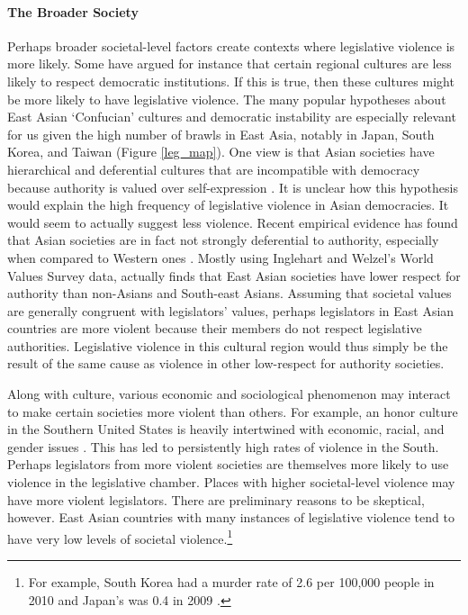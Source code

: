 \documentclass[a4paper]{article}\usepackage[]{graphicx}\usepackage[]{color}
\begin{document}
\paragraph{The Broader Society}

Perhaps broader societal-level factors create contexts where legislative violence is more likely. Some have argued for instance that certain regional cultures are less likely to respect democratic institutions. If this is true, then these cultures might be more likely to have legislative violence. The many popular hypotheses about East Asian `Confucian' cultures \citep[see][]{Inglehart2005, Inglehart2010} and democratic instability are especially relevant for us given the high number of brawls in East Asia, notably in Japan, South Korea, and Taiwan (Figure \ref{leg_map}). One view is that Asian societies have hierarchical and deferential cultures that are incompatible with democracy because authority is valued over self-expression \citep[see][212-213 for a discussion]{Dalton2005}. It is unclear how this hypothesis would explain the high frequency of legislative violence in Asian democracies. It would seem to actually suggest less violence. Recent empirical evidence has found that Asian societies are in fact not strongly deferential to authority, especially when compared to Western ones \citep{Dalton2005, KimAsianValues2010}. Mostly using Inglehart and Welzel's World Values Survey data, \cite{KimAsianValues2010} actually finds that East Asian societies have lower respect for authority than non-Asians and South-east Asians. Assuming that societal values are generally congruent with legislators' values, perhaps legislators in East Asian countries are more violent because their members do not respect legislative authorities. Legislative violence in this cultural region would thus simply be the result of the same cause as violence in other low-respect for authority societies.

Along with culture, various economic and sociological phenomenon may interact to make certain societies more violent than others. For example, an honor culture in the Southern United States is heavily intertwined with economic, racial, and gender issues \citep[see][]{nisbett1996culture}. This has led to persistently high rates of violence in the South. Perhaps legislators from more violent societies are themselves more likely to use violence in the legislative chamber. Places with higher societal-level violence may have more violent legislators. There are preliminary reasons to be skeptical, however. East Asian countries with many instances of legislative violence tend to have very low levels of societal violence.\footnote{For example, South Korea had a murder rate of 2.6 per 100,000 people in 2010 and Japan's was 0.4 in 2009 \cite{UNMurder2013}.}
\end{document}
